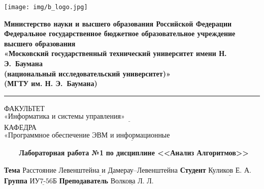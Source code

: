 \documentclass[a4paper,14pt, unknownkeysallowed]{extreport}
\begin{document}
\begin{titlepage}
	\fontsize{12pt}{12pt}\selectfont
	\noindent \begin{minipage}{0.15\textwidth}
		\texttt{[image: img/b\_logo.jpg]}
	\end{minipage}
	\noindent\begin{minipage}{0.9\textwidth}\centering
		\textbf{Министерство науки и высшего образования Российской Федерации}\\
		\textbf{Федеральное государственное бюджетное образовательное учреждение высшего образования}\\
		\textbf{«Московский государственный технический университет имени Н. Э.~Баумана}\\
		\textbf{(национальный исследовательский университет)»}\\
		\textbf{(МГТУ им. Н. Э.~Баумана)}
	\end{minipage}
	
	\noindent\rule{18cm}{3pt}
	\newline\newline
	\noindent ФАКУЛЬТЕТ $\underline{\text{«Информатика и системы управления»~~~~~~~~~~~~~~~~~~~~~~~~~~~~~~~~~~~~~~~~~~~~~~~~~~~~~~~}}$ \newline\newline
	\noindent КАФЕДРА $\underline{\text{«Программное обеспечение ЭВМ и информационные технологии»~~~~~~~~~~~~~~~~~~~~~~~}}$\newline\newline\newline\newline\newline\newline\newline
	
	
	\begin{center}
		\noindent\begin{minipage}{1.3\textwidth}\centering
		\Large\textbf{   ~~~ Лабораторная работа №1}\newline
		\textbf{по дисциплине <<Анализ Алгоритмов>>}\newline\newline\newline
		\end{minipage}
	\end{center}
	
	\noindent\textbf{Тема} 			$\underline{\text{Расстояние Левенштейна и Дамерау--Левенштейна}}$\newline\newline
	\noindent\textbf{Студент} 		$\underline{\text{Куликов Е. А.}}$\newline\newline
	\noindent\textbf{Группа} 		$\underline{\text{ИУ7-56Б}}$\newline\newline
	\noindent\textbf{Преподаватель} $\underline{\text{Волкова Л. Л.}}$\newline
	

\end{titlepage}
\end{document}

